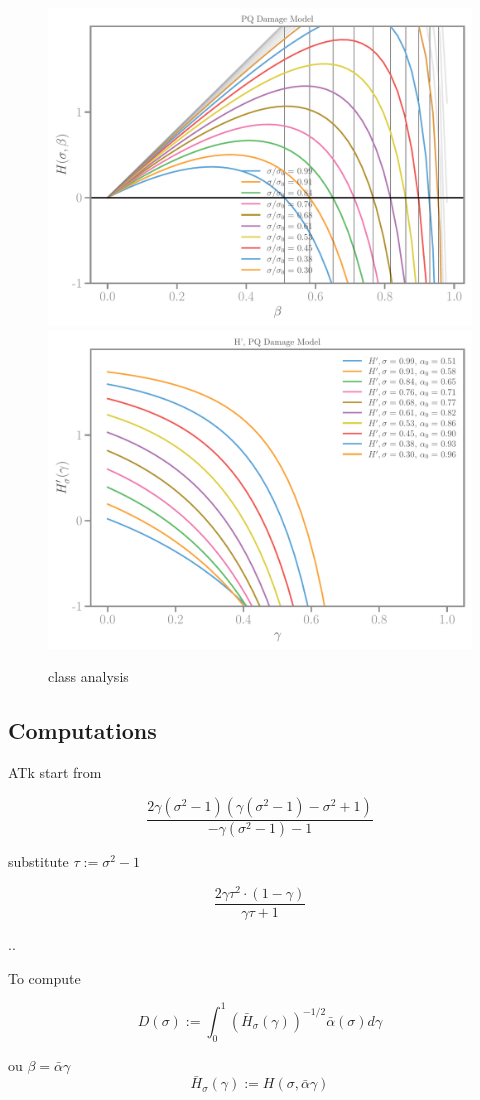\documentclass[]{article}
\begin{document}
\begin{figure}[htbp]
  \includegraphics[width=.33\textheight]{../figures/pq-Hbeta.pdf}
  \includegraphics[width=.33\textheight]{../figures/pq-H-prime-beta.pdf}
  \caption{class analysis}
  \label{fig:class-analyser}
\end{figure}



\clearpage

\subsection*{Computations}
ATk
start from 

$$
\frac{2 \gamma \left(\sigma^{2} - 1\right) \left(\gamma \left(\sigma^{2} - 1\right) - \sigma^{2} + 1\right)}{- \gamma \left(\sigma^{2} - 1\right) - 1}
$$

substitute $\tau := \sigma^2 - 1$

\begin{equation}
  \label{eqn:}
  \frac{2 \gamma \tau^{2} \cdot \left(1 - \gamma\right)}{\gamma \tau + 1}
\end{equation}


..


To compute 

$$
D(\sigma):=\int_0^1( \bar H_\sigma(\gamma) )^{-1/2}\bar \alpha(\sigma) d \gamma
$$

ou $\beta = \bar \alpha \gamma$
$$
\bar H_\sigma(\gamma) := H(\sigma, \bar \alpha \gamma) 
$$
\end{document}
